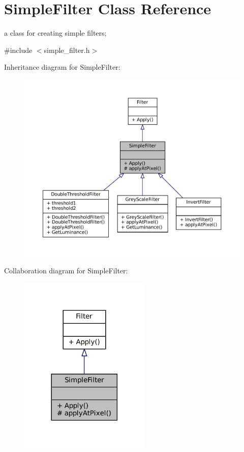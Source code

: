 \hypertarget{classSimpleFilter}{}\section{Simple\+Filter Class Reference}
\label{classSimpleFilter}


a class for creating simple filters;  




{\ttfamily \#include $<$simple\+\_\+filter.\+h$>$}



Inheritance diagram for Simple\+Filter\+:
\nopagebreak
\begin{figure}[H]
\begin{center}
\leavevmode
\includegraphics[width=350pt]{classSimpleFilter__inherit__graph}
\end{center}
\end{figure}


Collaboration diagram for Simple\+Filter\+:
\nopagebreak
\begin{figure}[H]
\begin{center}
\leavevmode
\includegraphics[width=177pt]{classSimpleFilter__coll__graph}
\end{center}
\end{figure}
